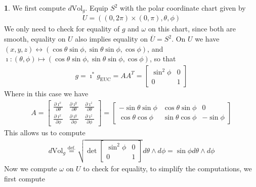 \documentclass[10.5pt]{article}
\theoremstyle{definition}
\newtheorem{pb}{}
\newcommand{\z}{\imath}
\begin{document}
    \begin{pb}
        We first compute \(d\text{Vol}_g\). Equip \(S^2\) with the polar coordinate chart given by
        \begin{align*}
            U = ((0,2\pi) \times (0,\pi),\theta,\phi)
        \end{align*}
        We only need to check for equality of \(g\) and \(\omega\) on this chart, since both are smooth, equality on \(U\) also implies equality on \(\overline{U} = S^2\).
        On \(U\) we have \((x,y,z) \longleftrightarrow (\cos\theta\sin\phi,\sin\theta\sin\phi,\cos\phi)\), and \newline
        \(\z: (\theta,\phi) \mapsto (\cos\theta\sin\phi,\sin\theta\sin\phi,\cos\phi)\), so that
        \begin{align*}
            g = \z^*g_{\text{EUC}} = AA^T = \begin{bmatrix} \sin^2\phi & 0 \\ 0 & 1 \end{bmatrix}
        \end{align*}
        Where in this case we have
        \begin{align*}
            A =
            \begin{bmatrix}  
                \frac{\partial \z^x}{\partial \theta} & \frac{\partial \z^y}{\partial \theta} & \frac{\partial \z^z}{\partial \theta} \\
                \frac{\partial \z^x}{\partial \phi} & \frac{\partial \z^y}{\partial \phi} & \frac{\partial \z^z}{\partial \phi}
            \end{bmatrix}
            =
             \begin{bmatrix}
                -\sin\theta\sin\phi & \cos\theta\sin\phi & 0\\
                \cos\theta\cos\phi & \sin\theta\cos\phi & -\sin\phi
            \end{bmatrix}
        \end{align*}
        This allows us to compute
        \begin{align*}
            d\text{Vol}_g \overset{\text{def.}}{=} \sqrt{\det \begin{bmatrix} \sin^2\phi & 0 \\ 0 & 1 \end{bmatrix}}d\theta \wedge d\phi = \sin\phi d\theta \wedge d\phi
        \end{align*}
        Now we compute \(\omega\) on \(U\) to check for equality, to simplify the computations, we first compute
        \begin{align*}

\end{align*}
\end{pb}
\end{document}
